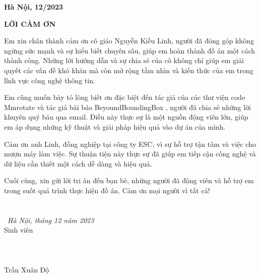 \documentclass[12pt,a4paper,openany,oneside]{report}
\begin{document}
\vfill
\begin{center}
	{{\bf Hà Nội, 12/2023}}
\end{center}


\newpage
\restoregeometry
 \pagestyle{fancy}
 \fontsize{13pt}{13pt}\selectfont \baselineskip 0.75cm 

\tableofcontents

\newpage
\begin{center}
	\Large{\textbf{LỜI CẢM ƠN}}\\
\end{center}
\vspace{1cm}
Em xin chân thành cảm ơn cô giáo Nguyễn Kiều Linh, người đã đóng góp không ngừng sức mạnh và sự hiểu biết chuyên sâu, giúp em hoàn thành đồ án một cách thành công. Những lời hướng dẫn và sự chia sẻ của cô không chỉ giúp em giải quyết các vấn đề khó khăn mà còn mở rộng tầm nhìn và kiến thức của em trong lĩnh vực công nghệ thông tin.

Em cũng muốn bày tỏ lòng biết ơn đặc biệt đến tác giả của các thư viện code Mmrotate và tác giả bài báo BeyoundBoundingBox \cite{Guo_2021CVPR_CFA}, người đã chia sẻ những lời khuyên quý báu qua email. Điều này thực sự là một nguồn động viên lớn, giúp em áp dụng những kỹ thuật và giải pháp hiệu quả vào dự án của mình.

Cảm ơn anh Linh, đồng nghiệp tại công ty ESC, vì sự hỗ trợ tận tâm và việc cho mượn máy làm việc. Sự thuận tiện này thực sự đã giúp em tiếp cận công nghệ và dữ liệu cần thiết một cách dễ dàng và hiệu quả.

Cuối cùng, xin gửi lời tri ân đến bạn bè, những người đã động viên và hỗ trợ em trong suốt quá trình thực hiện đồ án. Cảm ơn mọi người vì tất cả!
\
 \\
 
 \
  \\
 \
  \\
 
\phantom{nnnnnnnnnnnnnnnnnnnnnnnnnnnnnnn}\  {\textit{Hà Nội, tháng 12 năm 2023}} \\
\phantom{nnnnnnnnnnnnnnnnnnnnnnnnnnnnnnnnnnnnnnnnn} {Sinh viên}\\
\phantom{nnnnnnnnnnnnnnnnnnnnnnnnnnnnnnnnnn} \\
\phantom{nnnnnnnnnnnnnnnnnnnnnnnnnnnnnnnnnn} \\ 
\phantom{nnnnnnnnnnnnnnnnnnnnnnnnnnnnnnnnnn} \\ 
\phantom{nnnnnnnnnnnnnnnnnnnnnnnnnnnnnnnnnnnnnnn}   {Trần Xuân Độ}
\end{document}
